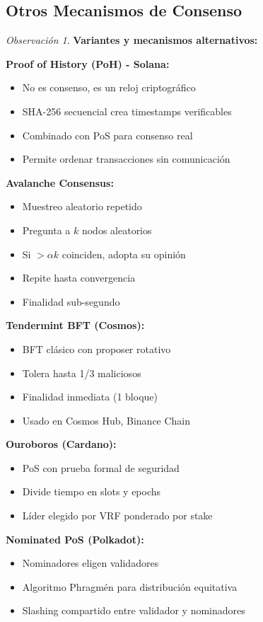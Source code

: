 \documentclass[11pt,a4paper,twoside,openright]{book}
\theoremstyle{definition}
\theoremstyle{plain}
\theoremstyle{remark}
\newtheorem{remark}{Observación}[chapter]
\begin{document}
\subsection{Otros Mecanismos de Consenso}

\begin{remark}
\textbf{Variantes y mecanismos alternativos:}

\textbf{Proof of History (PoH) - Solana:}
\begin{itemize}
    \item No es consenso, es un reloj criptográfico
    \item SHA-256 secuencial crea timestamps verificables
    \item Combinado con PoS para consenso real
    \item Permite ordenar transacciones sin comunicación
\end{itemize}

\textbf{Avalanche Consensus:}
\begin{itemize}
    \item Muestreo aleatorio repetido
    \item Pregunta a $k$ nodos aleatorios
    \item Si $>\alpha k$ coinciden, adopta su opinión
    \item Repite hasta convergencia
    \item Finalidad sub-segundo
\end{itemize}

\textbf{Tendermint BFT (Cosmos):}
\begin{itemize}
    \item BFT clásico con proposer rotativo
    \item Tolera hasta 1/3 maliciosos
    \item Finalidad inmediata (1 bloque)
    \item Usado en Cosmos Hub, Binance Chain
\end{itemize}

\textbf{Ouroboros (Cardano):}
\begin{itemize}
    \item PoS con prueba formal de seguridad
    \item Divide tiempo en slots y epochs
    \item Líder elegido por VRF ponderado por stake
\end{itemize}

\textbf{Nominated PoS (Polkadot):}
\begin{itemize}
    \item Nominadores eligen validadores
    \item Algoritmo Phragmén para distribución equitativa
    \item Slashing compartido entre validador y nominadores
\end{itemize}
\end{remark}
\end{document}
